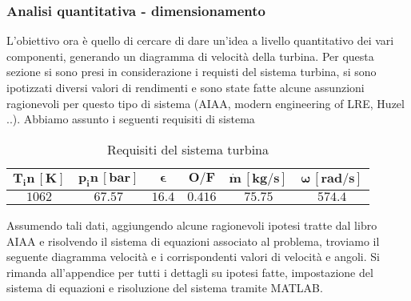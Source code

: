 \subsubsection{Analisi quantitativa - dimensionamento}

L'obiettivo ora è quello di cercare di dare un'idea a livello quantitativo dei vari componenti, generando un diagramma di velocità della turbina. 
Per questa sezione si sono presi in considerazione i requisti del sistema turbina, si sono ipotizzati diversi valori di rendimenti e sono state fatte alcune assunzioni ragionevoli per questo tipo di sistema (AIAA, modern engineering of LRE, Huzel ..). Abbiamo assunto i seguenti requisiti di sistema

\begin{table}[H]

\centering
\begin{tabular}{|c|c|c|c|c|c|}
\hline
$\bm{T_in \, [K]}$ & $\bm{p_in \, [bar]}$ & $\bm{\epsilon}$ &  $\bm{O/F}$ & $\bm{\dot{m} \, [kg/s]}$ & $\bm{\omega \, [rad/s]}$  \\
\hline
$1062$ & $67.57$ & $16.4$ &  $0.416$ & $75.75$ & $574.4$ \\
\hline
\end{tabular}

\caption{Requisiti del sistema turbina}
\label{table:turbine specs}

\end{table}

Assumendo tali dati, aggiungendo alcune ragionevoli ipotesi tratte dal libro AIAA e risolvendo il sistema di equazioni associato al problema, troviamo il seguente diagramma velocità e i corrispondenti valori di velocità e angoli. Si rimanda all'appendice per tutti i dettagli su ipotesi fatte, impostazione del sistema di equazioni e risoluzione del sistema tramite MATLAB.